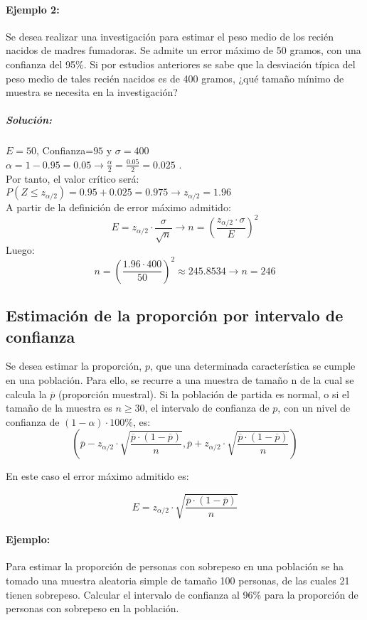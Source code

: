 \paragraph{Ejemplo 2:} Se desea realizar una investigación para estimar el peso medio de los recién nacidos de madres fumadoras. Se admite un error máximo de 50 gramos, con una confianza del 95\%. Si por estudios anteriores se sabe que la desviación típica del peso medio de tales recién nacidos es de 400 gramos, ¿qué tamaño mínimo de muestra se necesita en la investigación?\\

\subparagraph{Solución:}$E=50$, Confianza=$95$ y $\sigma=400$ \\
$\alpha=1-0.95=0.05 \to \frac{\alpha}{2}=\frac{0.05}{2}=0.025$
. \\ Por tanto, el valor crítico será: \\
$P\left(Z \leqslant z_{\alpha / 2} \right)= 0.95 + 0.025 = 0.975 \to z_{\alpha / 2} = 1.96$\\ A partir de la definición de error máximo admitido:
$$E=z_{\alpha / 2}\cdot \frac{\sigma}{\sqrt{n}} \to 
n = \left( \frac{z_{\alpha / 2} \cdot \sigma}{E} \right) ^ 2$$
Luego: \\
$$n = \left( \frac{1.96 \cdot 400}{50} \right) ^ 2\approx 245.8534 \to n=246
$$

\subsection{Estimación de la proporción por intervalo de confianza} Se desea estimar la proporción, $p$, que una determinada característica se cumple en una población.
Para ello, se recurre a una muestra de tamaño n de la cual se calcula la 
$\overline{p}$ (proporción muestral).
Si la población de partida es normal, o si el tamaño de la muestra es $n \geqslant 30 $, el intervalo de confianza de $p$, con un nivel de confianza de $\left( 1 - \alpha \right)\cdot 100 \% $, es: $$ \left( \overline{p} - z_{\alpha / 2}\cdot \sqrt{\frac{\overline{p}\cdot\left(1-\overline{p} \right)}{n}} ,  \overline{p} + z_{\alpha / 2}\cdot \sqrt{\frac{\overline{p}\cdot\left(1-\overline{p} \right)}{n}}\right)$$

En este caso el error máximo admitido es:

$$E=z_{\alpha / 2}\cdot \sqrt{\frac{\overline{p}\cdot\left(1-\overline{p} \right)}{n}}$$

\paragraph{Ejemplo:} Para estimar la proporción de personas con sobrepeso en una población se ha tomado una
muestra aleatoria simple de tamaño 100 personas, de las cuales 21 tienen sobrepeso. Calcular el intervalo
de confianza al 96\% para la proporción de personas con sobrepeso en la población.

